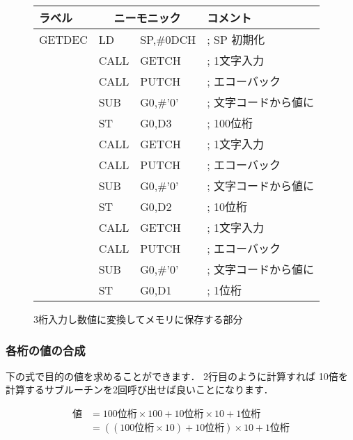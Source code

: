 \begin{figure}[btp]
{\small\tt\begin{center}
\begin{tabular}{|l|l l l|} \hline
ラベル & \multicolumn{2}{|c}{ニーモニック} & コメント    \\
\hline
GETDEC & LD   & SP,\#0DCH        & ; SP 初期化           \\
       & CALL & GETCH            & ; 1文字入力           \\
       & CALL & PUTCH            & ; エコーバック        \\
       & SUB  & G0,\#'0'         & ; 文字コードから値に  \\
       & ST   & G0,D3            & ; 100位桁             \\
       & CALL & GETCH            & ; 1文字入力           \\
       & CALL & PUTCH            & ; エコーバック        \\
       & SUB  & G0,\#'0'         & ; 文字コードから値に  \\
       & ST   & G0,D2            & ; 10位桁              \\
       & CALL & GETCH            & ; 1文字入力           \\
       & CALL & PUTCH            & ; エコーバック        \\
       & SUB  & G0,\#'0'         & ; 文字コードから値に  \\
       & ST   & G0,D1            & ; 1位桁               \\
\hline
\end{tabular}
\end{center}}
\caption{3桁入力し数値に変換してメモリに保存する部分}
\label{fig:chap6:henkan}
\end{figure}

\subsubsection{各桁の値の合成}

下の式で目的の値を求めることができます．
2行目のように計算すれば
10倍を計算するサブルーチンを2回呼び出せば良いことになります．

\begin{eqnarray}
値 & = 100位桁 \times 100 + 10位桁 \times 10 + 1位桁 \nonumber\\
   & = ((100位桁 \times 10) + 10位桁) \times 10 + 1位桁 \nonumber
\end{eqnarray}

